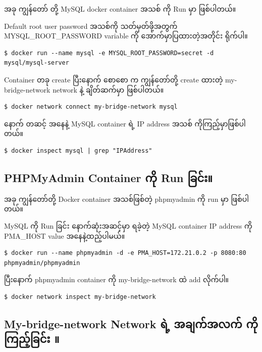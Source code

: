 \documentclass[]{article}
\begin{document}
အခု ကျွန်တော် တို့ MySQL docker container အသစ် ကို Run မှာ ဖြစ်ပါတယ်။

Default root user password အသစ်ကို သတ်မှတ်ဖို့အတွက်
MYSQL\_ROOT\_PASSWORD variable ကို အောက်မှာပြထားတဲ့အတိုင်း ရိုက်ပါ။

\begin{verbatim}
$ docker run --name mysql -e MYSQL_ROOT_PASSWORD=secret -d mysql/mysql-server
\end{verbatim}

Container တခု create ပြီးနောက် စောစော က ကျွန်တော်တို့ create ထားတဲ့
my-bridge-network network နဲ့ ချိတ်ဆက်မှာ ဖြစ်ပါတယ်။

\begin{verbatim}
$ docker network connect my-bridge-network mysql
\end{verbatim}

နောက် တဆင့် အနေနဲ့ MySQL container ရဲ့ IP address အသစ်
ကိုကြည့်မှာဖြစ်ပါတယ်။

\begin{verbatim}
$ docker inspect mysql | grep "IPAddress"
\end{verbatim}

\hypertarget{phpmyadmin-container-ux1000ux102dux102f-run-ux1001ux103cux1004ux103aux1038}{%
\subsection{PHPMyAdmin Container ကို Run
ခြင်း။}\label{phpmyadmin-container-ux1000ux102dux102f-run-ux1001ux103cux1004ux103aux1038}}

အခု ကျွန်တော်တို့ Docker container အသစ်ဖြစ်တဲ့ phpmyadmin ကို run မှာ
ဖြစ်ပါတယ်။

MySQL ကို Run ခြင်း နောက်ဆုံးအဆင့်မှာ ရခဲ့တဲ့ MySQL container IP address
ကို PMA\_HOST value အနေနဲ့ထည့်ပါမယ်။

\begin{verbatim}
$ docker run --name phpmyadmin -d -e PMA_HOST=172.21.0.2 -p 8080:80 phpmyadmin/phpmyadmin
\end{verbatim}

ပြီးနောက် phpmyadmin container ကို my-bridge-network ထဲ add လိုက်ပါ။

\begin{verbatim}
$ docker network inspect my-bridge-network
\end{verbatim}

\hypertarget{my-bridge-network-network-ux101bux1032ux1037-ux1021ux1001ux103bux1000ux103aux1021ux101cux1000ux103a-ux1000ux102dux102fux1000ux103cux100aux1037ux103aux1001ux103cux1004ux103aux1038}{%
\subsection{My-bridge-network Network ရဲ့ အချက်အလက် ကိုကြည့်ခြင်း
။}\label{my-bridge-network-network-ux101bux1032ux1037-ux1021ux1001ux103bux1000ux103aux1021ux101cux1000ux103a-ux1000ux102dux102fux1000ux103cux100aux1037ux103aux1001ux103cux1004ux103aux1038}}
\end{document}
